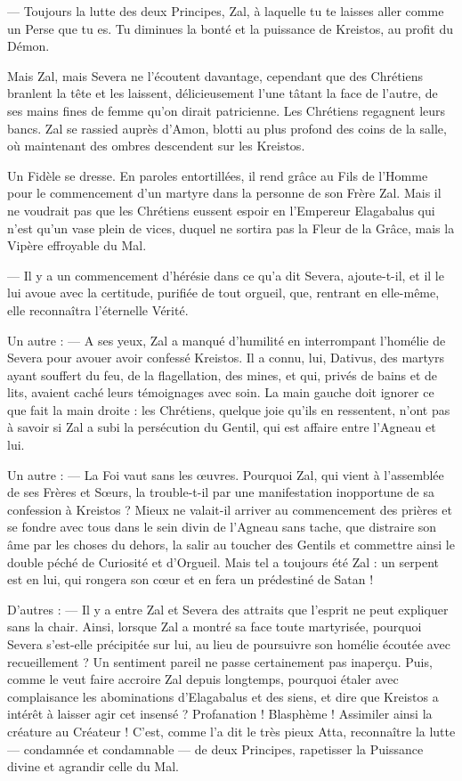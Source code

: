 \documentclass[a4paper, 11pt, oneside, polutonikogreek, french]{article}
\begin{document}
--- Toujours la lutte des deux Principes, Zal, à laquelle tu te laisses aller comme un Perse que tu es. Tu diminues la bonté et la puissance de Kreistos, au profit du Démon.

Mais Zal, mais Severa ne l'écoutent davantage, cependant que des Chrétiens branlent la tête et les laissent, délicieusement l'une tâtant la face de l'autre, de ses mains fines de femme qu'on dirait patricienne. Les Chrétiens regagnent leurs bancs. Zal se rassied auprès d'Amon, blotti au plus profond des coins de la salle, où maintenant des ombres descendent sur les Kreistos.

Un Fidèle se dresse. En paroles entortillées, il rend grâce au Fils de l'Homme pour le commencement d'un martyre dans la personne de son Frère Zal. Mais il ne voudrait pas que les Chrétiens eussent espoir en l'Empereur Elagabalus qui n'est qu'un vase plein de vices, duquel ne sortira pas la Fleur de la Grâce, mais la Vipère effroyable du Mal.

--- Il y a un commencement d'hérésie dans ce qu'a dit Severa, ajoute-t-il, et il le lui avoue avec la certitude, purifiée de tout orgueil, que, rentrant en elle-même, elle reconnaîtra l'éternelle Vérité.

Un autre : --- A ses yeux, Zal a manqué d'humilité en interrompant l'homélie de Severa pour avouer avoir confessé Kreistos. Il a connu, lui, Dativus, des martyrs ayant souffert du feu, de la flagellation, des mines, et qui, privés de bains et de lits, avaient caché leurs témoignages avec soin. La main gauche doit ignorer ce que fait la main droite : les Chrétiens, quelque joie qu'ils en ressentent, n'ont pas à savoir si Zal a subi la persécution du Gentil, qui est affaire entre l'Agneau et lui.

Un autre : --- La Foi vaut sans les œuvres. Pourquoi Zal, qui vient à l'assemblée de ses Frères et Sœurs, la trouble-t-il par une manifestation inopportune de sa confession à Kreistos ? Mieux ne valait-il arriver au commencement des prières et se fondre avec tous dans le sein divin de l'Agneau sans tache, que distraire son âme par les choses du dehors, la salir au toucher des Gentils et commettre ainsi le double péché de Curiosité et d'Orgueil. Mais tel a toujours été Zal : un serpent est en lui, qui rongera son cœur et en fera un prédestiné de Satan !

D'autres : --- Il y a entre Zal et Severa des attraits que l'esprit ne peut expliquer sans la chair. Ainsi, lorsque Zal a montré sa face toute martyrisée, pourquoi Severa s'est-elle précipitée sur lui, au lieu de poursuivre son homélie écoutée avec recueillement ? Un sentiment pareil ne passe certainement pas inaperçu. Puis, comme le veut faire accroire Zal depuis longtemps, pourquoi étaler avec complaisance les abominations d'Elagabalus et des siens, et dire que Kreistos a intérêt à laisser agir cet insensé ? Profanation ! Blasphème ! Assimiler ainsi la créature au Créateur ! C'est, comme l'a dit le très pieux Atta, reconnaître la lutte --- condamnée et condamnable --- de deux Principes, rapetisser la Puissance divine et agrandir celle du Mal.
\end{document}
